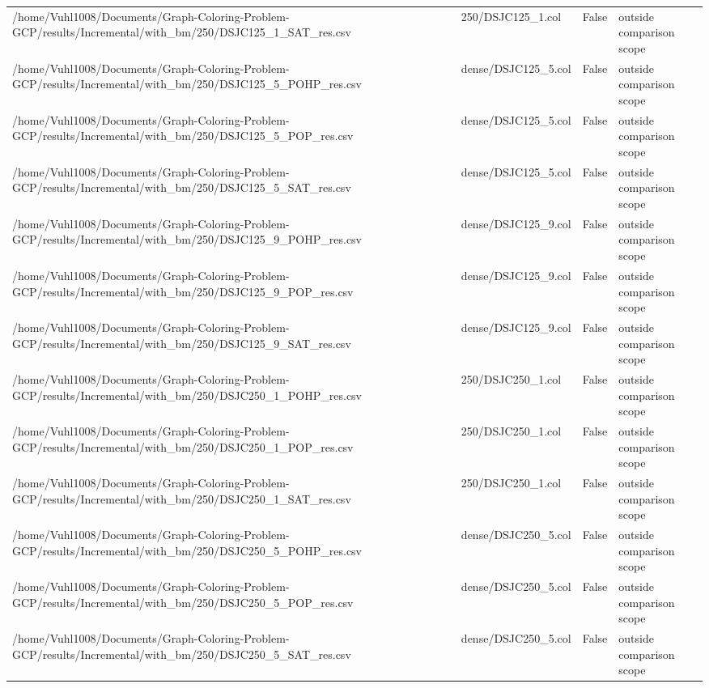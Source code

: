 \begin{table}[htbp]
\begin{tabular}{llll}
/home/Vuhl1008/Documents/Graph-Coloring-Problem-GCP/results/Incremental/with\_bm/250/DSJC125\_1\_SAT\_res.csv & 250/DSJC125\_1.col & False & outside comparison scope \\
/home/Vuhl1008/Documents/Graph-Coloring-Problem-GCP/results/Incremental/with\_bm/250/DSJC125\_5\_POHP\_res.csv & dense/DSJC125\_5.col & False & outside comparison scope \\
/home/Vuhl1008/Documents/Graph-Coloring-Problem-GCP/results/Incremental/with\_bm/250/DSJC125\_5\_POP\_res.csv & dense/DSJC125\_5.col & False & outside comparison scope \\
/home/Vuhl1008/Documents/Graph-Coloring-Problem-GCP/results/Incremental/with\_bm/250/DSJC125\_5\_SAT\_res.csv & dense/DSJC125\_5.col & False & outside comparison scope \\
/home/Vuhl1008/Documents/Graph-Coloring-Problem-GCP/results/Incremental/with\_bm/250/DSJC125\_9\_POHP\_res.csv & dense/DSJC125\_9.col & False & outside comparison scope \\
/home/Vuhl1008/Documents/Graph-Coloring-Problem-GCP/results/Incremental/with\_bm/250/DSJC125\_9\_POP\_res.csv & dense/DSJC125\_9.col & False & outside comparison scope \\
/home/Vuhl1008/Documents/Graph-Coloring-Problem-GCP/results/Incremental/with\_bm/250/DSJC125\_9\_SAT\_res.csv & dense/DSJC125\_9.col & False & outside comparison scope \\
/home/Vuhl1008/Documents/Graph-Coloring-Problem-GCP/results/Incremental/with\_bm/250/DSJC250\_1\_POHP\_res.csv & 250/DSJC250\_1.col & False & outside comparison scope \\
/home/Vuhl1008/Documents/Graph-Coloring-Problem-GCP/results/Incremental/with\_bm/250/DSJC250\_1\_POP\_res.csv & 250/DSJC250\_1.col & False & outside comparison scope \\
/home/Vuhl1008/Documents/Graph-Coloring-Problem-GCP/results/Incremental/with\_bm/250/DSJC250\_1\_SAT\_res.csv & 250/DSJC250\_1.col & False & outside comparison scope \\
/home/Vuhl1008/Documents/Graph-Coloring-Problem-GCP/results/Incremental/with\_bm/250/DSJC250\_5\_POHP\_res.csv & dense/DSJC250\_5.col & False & outside comparison scope \\
/home/Vuhl1008/Documents/Graph-Coloring-Problem-GCP/results/Incremental/with\_bm/250/DSJC250\_5\_POP\_res.csv & dense/DSJC250\_5.col & False & outside comparison scope \\
/home/Vuhl1008/Documents/Graph-Coloring-Problem-GCP/results/Incremental/with\_bm/250/DSJC250\_5\_SAT\_res.csv & dense/DSJC250\_5.col & False & outside comparison scope \\

\end{tabular}
\end{table}
